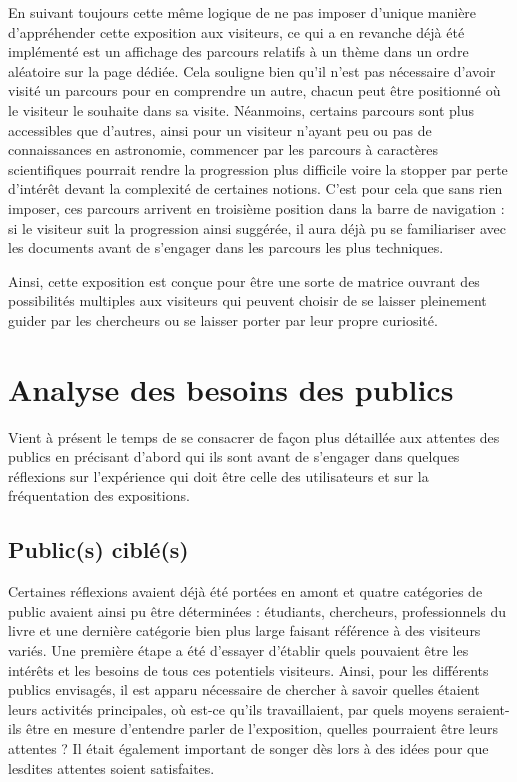     En suivant toujours cette même logique de ne pas imposer d’unique manière d’appréhender cette exposition aux visiteurs, ce qui a en revanche déjà été implémenté est un affichage des parcours relatifs à un thème dans un ordre aléatoire sur la page dédiée. Cela souligne bien qu’il n’est pas nécessaire d’avoir visité un parcours pour en comprendre un autre, chacun peut être positionné où le visiteur le souhaite dans sa visite. Néanmoins, certains parcours sont plus accessibles que d’autres, ainsi pour un visiteur n’ayant peu ou pas de connaissances en astronomie, commencer par les parcours à caractères scientifiques pourrait rendre la progression plus difficile voire la stopper par perte d’intérêt devant la complexité de certaines notions. C’est pour cela que sans rien imposer, ces parcours arrivent en troisième position dans la barre de navigation : si le visiteur suit la progression ainsi suggérée, il aura déjà pu se familiariser avec les documents avant de s’engager dans les parcours les plus techniques. 

    Ainsi, cette exposition est conçue pour être une sorte de matrice ouvrant des possibilités multiples aux visiteurs qui peuvent choisir de se laisser pleinement guider par les chercheurs ou se laisser porter par leur propre curiosité. 

	
	\chapter{Analyse des besoins des publics}
	Vient à présent le temps de se consacrer de façon plus détaillée aux attentes des publics en précisant d'abord qui ils sont avant de s'engager dans quelques réflexions sur l'expérience qui doit être celle des utilisateurs et sur la fréquentation des expositions. 
	
	\section{Public(s) ciblé(s)}
    Certaines réflexions avaient déjà été portées en amont et quatre catégories de public avaient ainsi pu être déterminées : étudiants, chercheurs, professionnels du livre et une dernière catégorie bien plus large faisant référence à des visiteurs variés. Une première étape a été d’essayer d’établir quels pouvaient être les intérêts et les besoins de tous ces potentiels visiteurs. 
    Ainsi, pour les différents publics envisagés, il est apparu nécessaire de chercher à savoir quelles étaient leurs activités principales, où est-ce qu’ils travaillaient, par quels moyens seraient-ils être en mesure d’entendre parler de l’exposition, quelles pourraient être leurs attentes ? Il était également important de songer dès lors à des idées pour que lesdites attentes soient satisfaites. 

